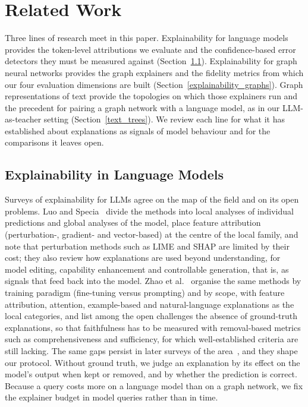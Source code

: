 \documentclass[preprint, times, review, 10pt]{elsarticle}
\begin{document}
\section{Related Work}

Three lines of research meet in this paper. Explainability for language models provides the token-level attributions we evaluate and the confidence-based error detectors they must be measured against (Section~\ref{explainability_lm}). Explainability for graph neural networks provides the graph explainers and the fidelity metrics from which our four evaluation dimensions are built (Section~\ref{explainability_graphs}). Graph representations of text provide the topologies on which those explainers run and the precedent for pairing a graph network with a language model, as in our LLM-as-teacher setting (Section~\ref{text_trees}). We review each line for what it has established about explanations as signals of model behaviour and for the comparisons it leaves open.

\subsection{Explainability in Language Models} \label{explainability_lm}

Surveys of explainability for LLMs agree on the map of the field and on its open problems. Luo and Specia~\cite{luo2024understandingutilizationsurveyexplainability} divide the methods into local analyses of individual predictions and global analyses of the model, place feature attribution (perturbation-, gradient- and vector-based) at the centre of the local family, and note that perturbation methods such as LIME and SHAP are limited by their cost; they also review how explanations are used beyond understanding, for model editing, capability enhancement and controllable generation, that is, as signals that feed back into the model. Zhao et al.~\cite{zhao2024surveyllm-xai} organise the same methods by training paradigm (fine-tuning versus prompting) and by scope, with feature attribution, attention, example-based and natural-language explanations as the local categories, and list among the open challenges the absence of ground-truth explanations, so that faithfulness has to be measured with removal-based metrics such as comprehensiveness and sufficiency, for which well-established criteria are still lacking. The same gaps persist in later surveys of the area~\cite{palikhe2025survey-llm-xai}, and they shape our protocol. Without ground truth, we judge an explanation by its effect on the model's output when kept or removed, and by whether the prediction is correct. Because a query costs more on a language model than on a graph network, we fix the explainer budget in model queries rather than in time.
\end{document}

